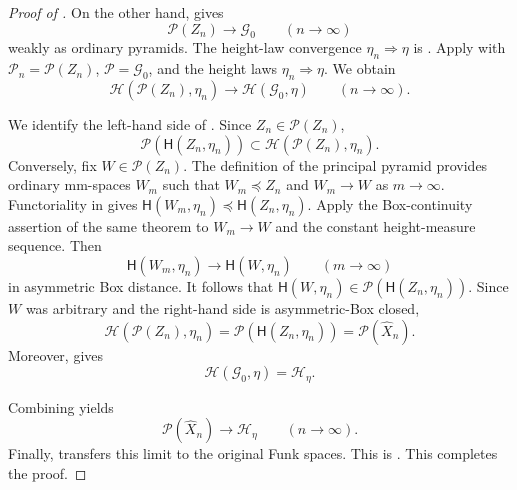 \documentclass[10pt,a4paper]{amsart}
\numberwithin{equation}{section}
\newcommand{\Pyr}{\mathcal P}
\begin{document}
\begin{proof}[Proof of ]
On the other hand, \cite[Theorem~1.1(3)]{shioya2017spheres} gives
\begin{equation}\label{eq:joint-spherical-pyramid-limit}
 \Pyr(Z_n)\longrightarrow\mathcal G_0
 \qquad(n\to\infty)
\end{equation}
weakly as ordinary pyramids.  The height-law convergence $\eta_n\Rightarrow\eta$ is
.  Apply
 with
$\mathcal P_n=\Pyr(Z_n)$, $\mathcal P=\mathcal G_0$, and the height laws $\eta_n\Rightarrow\eta$.  We obtain
\begin{equation}\label{eq:joint-comparison-pyramid-limit}
 \mathcal H(\Pyr(Z_n),\eta_n)
 \longrightarrow
 \mathcal H(\mathcal G_0,\eta)
 \qquad(n\to\infty).
\end{equation}

We identify the left-hand side of .  Since $Z_n\in\Pyr(Z_n)$,
\[
 \Pyr(\mathsf H(Z_n,\eta_n))
 \subset\mathcal H(\Pyr(Z_n),\eta_n).
\]
Conversely, fix $W\in\Pyr(Z_n)$.  The definition of the principal pyramid provides ordinary mm-spaces $W_m$ such that
$W_m\preceq Z_n$ and $W_m\to W$ as $m\to\infty$.  Functoriality in  gives
$\mathsf H(W_m,\eta_n)\preceq\mathsf H(Z_n,\eta_n)$.  Apply the Box-continuity assertion of the same theorem to
$W_m\to W$ and the constant height-measure sequence.  Then
\[
 \mathsf H(W_m,\eta_n)\longrightarrow\mathsf H(W,\eta_n)
 \qquad(m\to\infty)
\]
in asymmetric Box distance.  It follows that
$\mathsf H(W,\eta_n)\in\Pyr(\mathsf H(Z_n,\eta_n))$.  Since $W$ was arbitrary and the right-hand side is
asymmetric-Box closed,
\begin{equation}\label{eq:principal-base-horocone-identity}
 \mathcal H(\Pyr(Z_n),\eta_n)
 =\Pyr(\mathsf H(Z_n,\eta_n))
 =\Pyr(\widehat X_n).
\end{equation}
Moreover,  gives
\begin{equation}\label{eq:joint-radial-target-identity}
 \mathcal H(\mathcal G_0,\eta)=\mathcal H_\eta.
\end{equation}

Combining
 yields
\[
 \Pyr(\widehat X_n)\longrightarrow\mathcal H_\eta
 \qquad(n\to\infty).
\]
Finally,  transfers this limit to the original Funk spaces.  This is
.  This completes the proof.
\end{proof}
\end{document}

